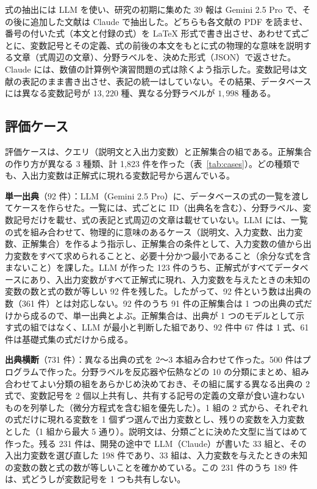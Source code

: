 \documentclass[a4j,dvipdfmx,11pt]{jresume}
\begin{document}
式の抽出には LLM を使い、研究の初期に集めた 39 報は Gemini 2.5 Pro で、その後に追加した文献は Claude で抽出した。どちらも各文献の PDF を読ませ、番号の付いた式（本文と付録の式）を \LaTeX{} 形式で書き出させ、あわせて式ごとに、変数記号とその定義、式の前後の本文をもとに式の物理的な意味を説明する文章（式周辺の文章）、分野ラベルを、決めた形式（JSON）で返させた。Claude には、数値の計算例や演習問題の式は除くよう指示した。変数記号は文献の表記のまま書き出させ、表記の統一はしていない。その結果、データベースには異なる変数記号が $13{,}220$ 種、異なる分野ラベルが $1{,}998$ 種ある。

\subsection{評価ケース}\label{sec:cases}
評価ケースは、クエリ（説明文と入出力変数）と正解集合の組である。正解集合の作り方が異なる 3 種類、計 1{,}823 件を作った（表~\ref{tab:cases}）。どの種類でも、入出力変数は正解式に現れる変数記号から選んでいる。

\textbf{単一出典}（92 件）：LLM（Gemini 2.5 Pro）に、データベースの式の一覧を渡してケースを作らせた。一覧には、式ごとに ID（出典名を含む）、分野ラベル、変数記号だけを載せ、式の表記と式周辺の文章は載せていない。LLM には、一覧の式を組み合わせて、物理的に意味のあるケース（説明文、入力変数、出力変数、正解集合）を作るよう指示し、正解集合の条件として、入力変数の値から出力変数をすべて求められることと、必要十分かつ最小であること（余分な式を含まないこと）を課した。LLM が作った 123 件のうち、正解式がすべてデータベースにあり、入出力変数がすべて正解式に現れ、入力変数を与えたときの未知の変数の数と式の数が等しい 92 件を残した。したがって、92 件という数は出典の数（361 件）とは対応しない。92 件のうち 91 件の正解集合は 1 つの出典の式だけから成るので、単一出典とよぶ。正解集合は、出典が 1 つのモデルとして示す式の組ではなく、LLM が最小と判断した組であり、92 件中 67 件は 1 式、61 件は基礎式集の式だけから成る。

\textbf{出典横断}（731 件）：異なる出典の式を 2〜3 本組み合わせて作った。500 件はプログラムで作った。分野ラベルを反応器や伝熱などの 10 の分類にまとめ、組み合わせてよい分類の組をあらかじめ決めておき、その組に属する異なる出典の 2 式で、変数記号を 2 個以上共有し、共有する記号の定義の文章が食い違わないものを列挙した（微分方程式を含む組を優先した）。1 組の 2 式から、それぞれの式だけに現れる変数を 1 個ずつ選んで出力変数とし、残りの変数を入力変数とした（1 組から最大 5 通り）。説明文は、分類ごとに決めた文型に当てはめて作った。残る 231 件は、開発の途中で LLM（Claude）が書いた 33 組と、その入出力変数を選び直した 198 件であり、33 組は、入力変数を与えたときの未知の変数の数と式の数が等しいことを確かめている。この 231 件のうち 189 件は、式どうしが変数記号を 1 つも共有しない。
\end{document}
